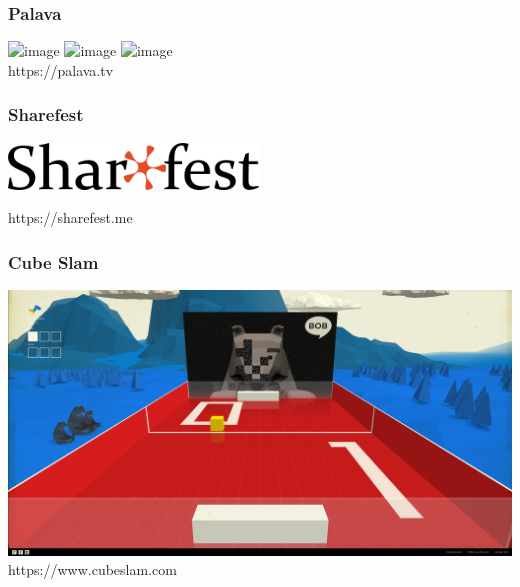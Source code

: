 \documentclass[12pt]{beamer}
\begin{document}
\begin{frame}
  \frametitle{Palava}
  \includegraphics<1>[height=0.7\textheight]{img/palava_1.jpg}
  \includegraphics<2>[height=0.7\textheight]{img/palava_2.jpg}
  \includegraphics<3>[height=0.7\textheight]{img/palava_3.jpg}
  \\ \hfill \tiny https://palava.tv
\end{frame}

\begin{frame}
  \frametitle{Sharefest}
  \centerline{\includegraphics[width=0.5\textwidth]{img/sharefest.png}}
  \centerline{\tiny https://sharefest.me}
\end{frame}

\begin{frame}
  \frametitle{Cube Slam}
  \includegraphics[height=0.7\textheight]{img/cube_slam.png} \\
  \hfill \tiny https://www.cubeslam.com
\end{frame}
\end{document}
